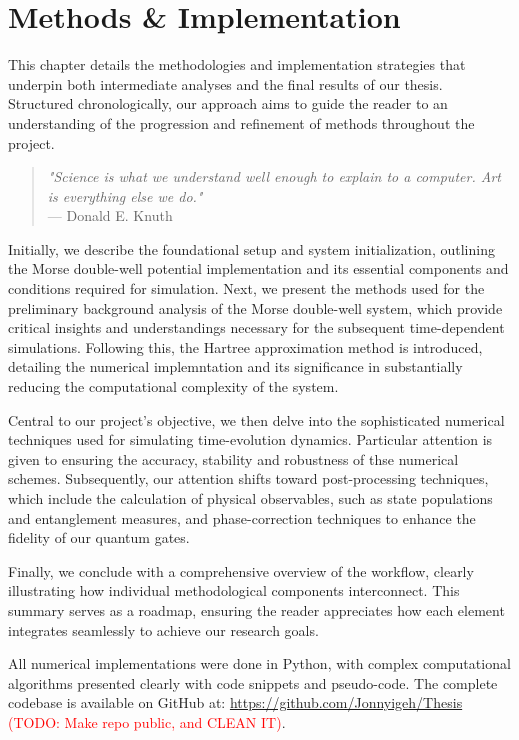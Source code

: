 \documentclass{subfiles}
\begin{document}
\chapter{Methods \& Implementation}
This chapter details the methodologies and implementation strategies that underpin both intermediate analyses and the final results of our thesis. Structured chronologically, our approach aims to guide the reader to an understanding of the progression and refinement of methods throughout the project. 

\begin{quote}
    \centering
    \textit{"Science is what we understand well enough to explain to a computer. Art is everything else we do."}\\
    \vspace{0.2cm}
    --- Donald E. Knuth
\end{quote}


Initially, we describe the foundational setup and system initialization, outlining the Morse double-well potential implementation and its essential components and conditions required for simulation. Next, we present the methods used for the preliminary background analysis of the Morse double-well system, which provide critical insights and understandings necessary for the subsequent time-dependent simulations. Following this, the Hartree approximation method is introduced, detailing the numerical implemntation and its significance in substantially reducing the computational complexity of the system.

Central to our project's objective, we then delve into the sophisticated numerical techniques used for simulating time-evolution dynamics. Particular attention is given to ensuring the accuracy, stability and robustness of thse numerical schemes. Subsequently, our attention shifts toward post-processing techniques, which include the calculation of physical observables, such as state populations and entanglement measures, and phase-correction techniques to enhance the fidelity of our quantum gates.

Finally, we conclude with a comprehensive overview of the workflow, clearly illustrating how individual methodological components interconnect. This summary serves as a roadmap, ensuring the reader appreciates how each element integrates seamlessly to achieve our research goals.

All numerical implementations were done in Python, with complex computational algorithms presented clearly with code snippets and pseudo-code. The complete codebase is available on GitHub at: \url{https://github.com/Jonnyigeh/Thesis} \textcolor{red}{(TODO: Make repo public, and CLEAN IT)}.
\newpage






\end{document}
